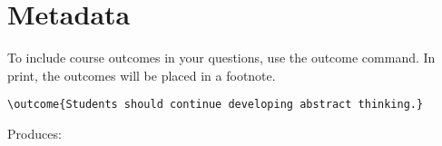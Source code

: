 \documentclass{ximera}
\begin{document}
\section{Metadata} \label{Metadata}

\begin{example} To include course outcomes in your questions, use the outcome command. In print, the outcomes will be placed in a footnote.

\begin{verbatim}
\outcome{Students should continue developing abstract thinking.}
\end{verbatim}

Produces:

\end{example}
\end{document}
